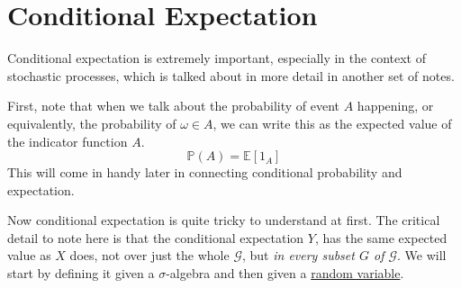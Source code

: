 \section{Conditional Expectation}

  Conditional expectation is extremely important, especially in the context of stochastic processes, which is talked about in more detail in another set of notes. 

  First, note that when we talk about the probability of event $A$ happening, or equivalently, the probability of $\omega \in A$, we can write this as the expected value of the indicator function $A$. 
  \begin{equation}
    \mathbb{P}(A) = \mathbb{E}[1_A]
  \end{equation}
  This will come in handy later in connecting conditional probability and expectation. 

  Now conditional expectation is quite tricky to understand at first. The critical detail to note here is that the conditional expectation $Y$, has the same expected value as $X$ does, not over just the whole $\mathcal{G}$, but \textit{in every subset $G$ of $\mathcal{G}$}. We will start by defining it given a $\sigma$-algebra and then given a \hyperref[def:random-variable]{random variable}. 

